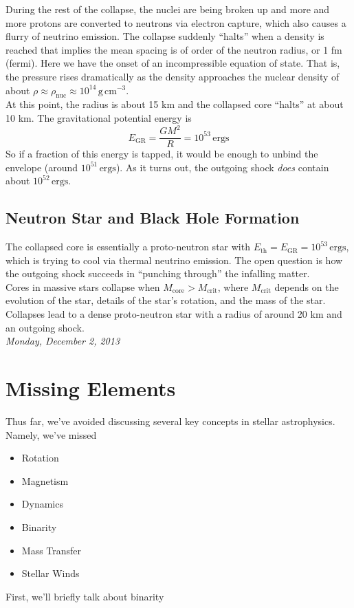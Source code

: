 \documentclass[10pt]{article}
\numberwithin{equation}{section}
\newcommand{\n}{\noindent}
\begin{document}
	\n During the rest of the collapse, the nuclei are being
        broken up and more and more protons are converted to neutrons
        via electron capture, which also causes a flurry of neutrino
        emission. The collapse suddenly ``halts'' when a density is
        reached that implies the mean spacing is of order of the
        neutron radius, or 1 fm (fermi). Here we have the onset of an
        incompressible equation of state. That is, the pressure rises
        dramatically as the density approaches the nuclear density of
        about $\rho\approx \rho_{\mathrm{nuc}}\approx
        10^{14}\,\mathrm{g\,cm^{-3}}$.\\ 
	
	\n At this point, the radius is about 15 km and the collapsed
        core ``halts'' at about 10 km. The gravitational potential
        energy is 
	\begin{equation}
	E_{\mathrm{GR}}=\frac{GM^{2}}{R}=10^{53}\,\mathrm{ergs}
	\end{equation}
	So if a fraction of this energy is tapped, it would be enough
        to unbind the envelope (around $10^{51}\,\mathrm{ergs}$). As
        it turns out, the outgoing shock \emph{does} contain about
        $10^{52}\,\mathrm{ergs}$. 
	
	\subsection{Neutron Star and Black Hole Formation}
	\label{sec:neutron-star} 
	The collapsed core is essentially a proto-neutron star with
        $E_{\mathrm{th}}=E_{\mathrm{GR}}=10^{53}\,\mathrm{ergs}$,
        which is trying to cool via thermal neutrino emission. The
        open question is how the outgoing shock succeeds in ``punching
        through'' the infalling matter.\\
	
	\n Cores in massive stars collapse when
        $M_{\mathrm{core}}>M_{\mathrm{crit}}$, where
        $M_{\mathrm{crit}}$ depends on the evolution of the star,
        details of the star's rotation, and the mass of the
        star. Collapses lead to a dense proto-neutron star with a
        radius of around 20 km and an outgoing shock. \\
        
  \n\textit{Monday, December 2, 2013}
  \section{Missing Elements} %
  \label{sec:missing_elements}
  Thus far, we've avoided discussing several key concepts in stellar astrophysics. Namely, we've missed
  \begin{itemize}
    \item Rotation
    \item Magnetism
    \item Dynamics
    \item Binarity
    \item Mass Transfer
    \item Stellar Winds
  \end{itemize}
  First, we'll briefly talk about binarity
\end{document}
